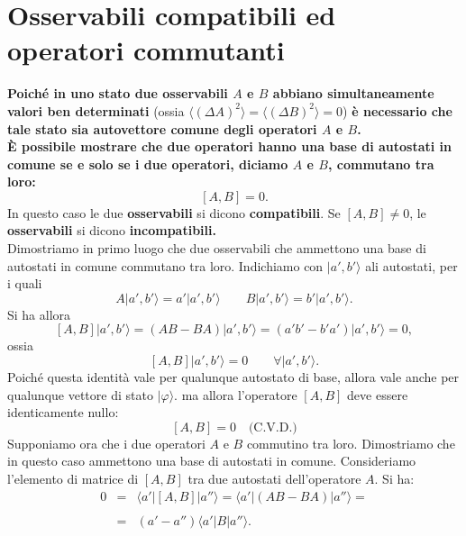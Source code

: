 \section{Osservabili compatibili ed operatori commutanti}
\textbf{Poiché in uno stato due osservabili $A$ e $B$ abbiano simultaneamente valori ben determinati} (ossia $\langle (\Delta A ) ^2 \rangle = \langle (\Delta B ) ^2 \rangle =0$) \textbf{è necessario che tale stato sia autovettore comune degli operatori $A$ e $B$.}\\
\textbf{È possibile mostrare che due operatori hanno una base di autostati in comune se e solo se i due operatori, diciamo $A$ e $B$, commutano tra loro:}
\begin{equation}
\left[ A, B \right] =0.
\end{equation}
In questo caso le due \textbf{osservabili} si dicono \textbf{compatibili}. Se $\left[ A, B\right] \neq 0$, le \textbf{osservabili} si dicono \textbf{incompatibili.}\\
Dimostriamo in primo luogo che due osservabili che ammettono una base di autostati in comune commutano tra loro. Indichiamo con $\vert a', b' \rangle$ ali autostati, per i quali
\begin{equation}
A\vert a', b' \rangle= a'\vert a', b' \rangle \qquad B\vert a', b' \rangle= b'\vert a', b' \rangle.
\end{equation}
Si ha allora
\begin{equation}
\left[ A, B \right]\vert a', b' \rangle = \left(AB-BA\right)\vert a', b' \rangle=\left( a'b'-b'a'\right)\vert a', b' \rangle=0,
\end{equation}
ossia
\begin{equation}
\left[A,B\right]\vert a', b' \rangle=0 \qquad \forall \vert a', b' \rangle.
\end{equation}
Poiché questa identità vale per qualunque autostato di base, allora vale anche per qualunque vettore di stato $\vert \varphi \rangle$. ma allora l'operatore $\left[ A, B \right]$ deve essere identicamente nullo:
\begin{equation}
\left[ A, B \right] =0 \quad \textrm{(C.V.D.)}
\end{equation}
Supponiamo ora che i due operatori $A$ e $B$ commutino tra loro. Dimostriamo che in questo caso ammettono una base di autostati in comune. Consideriamo l'elemento di matrice di $[A,B]$ tra due autostati dell'operatore $A$. Si ha:
\begin{eqnarray}
0& = & \langle a' \vert \left[A, B\right] \vert a'' \rangle = \langle a' \vert \left( AB-BA \right) \vert a'' \rangle = \nonumber \\
\\
& = & \left( a'-a''\right) \langle a' \vert B \vert a'' \rangle .\nonumber 
\end{eqnarray}
